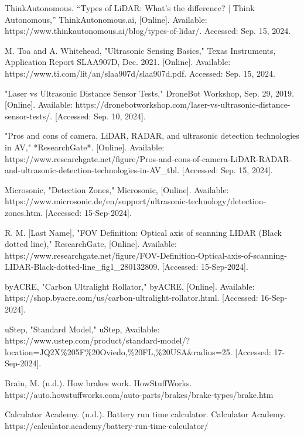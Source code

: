 \begin{thebibliography}{45}
	 ThinkAutonomous. “Types of LiDAR: What's the difference? | Think Autonomous,” ThinkAutonomous.ai, [Online]. Available: https://www.thinkautonomous.ai/blog/types-of-lidar/. Accessed: Sep. 15, 2024.
	
	 M. Toa and A. Whitehead, "Ultrasonic Sensing Basics," Texas Instruments, Application Report SLAA907D, Dec. 2021. [Online]. Available: https://www.ti.com/lit/an/slaa907d/slaa907d.pdf. Accessed: Sep. 15, 2024.
	
	 "Laser vs Ultrasonic Distance Sensor Tests," DroneBot Workshop, Sep. 29, 2019. [Online]. Available: https://dronebotworkshop.com/laser-vs-ultrasonic-distance-sensor-tests/. [Accessed: Sep. 10, 2024].
	
	 "Pros and cons of camera, LiDAR, RADAR, and ultrasonic detection technologies in AV," *ResearchGate*. [Online]. Available: https://www.researchgate.net/figure/Pros-and-cons-of-camera-LiDAR-RADAR-and-ultrasonic-detection-technologies-in-AV\_tbl. [Accessed: Sep. 15, 2024].
	
	 Microsonic, "Detection Zones," Microsonic, [Online]. Available: https://www.microsonic.de/en/support/ultrasonic-technology/detection-zones.htm. [Accessed: 15-Sep-2024].
	
	 R. M. [Last Name], "FOV Definition: Optical axis of scanning LIDAR (Black dotted line)," ResearchGate, [Online]. Available: https://www.researchgate.net/figure/FOV-Definition-Optical-axis-of-scanning-LIDAR-Black-dotted-line\_fig1\_280132809. [Accessed: 15-Sep-2024].
	
	 byACRE, "Carbon Ultralight Rollator," byACRE, [Online]. Available: https://shop.byacre.com/us/carbon-ultralight-rollator.html. [Accessed: 16-Sep-2024].
	
	 uStep, "Standard Model," uStep, Available: https://www.ustep.com/product/standard-model/?location=JQ2X\%205F\%20Oviedo,\%20FL,\%20USA\&radius=25. [Accessed: 17-Sep-2024].

	 Brain, M. (n.d.). How brakes work. HowStuffWorks. https://auto.howstuffworks.com/auto-parts/brakes/brake-types/brake.htm
	
	 Calculator Academy. (n.d.). Battery run time calculator. Calculator Academy. https://calculator.academy/battery-run-time-calculator/ 
	

\end{thebibliography}
